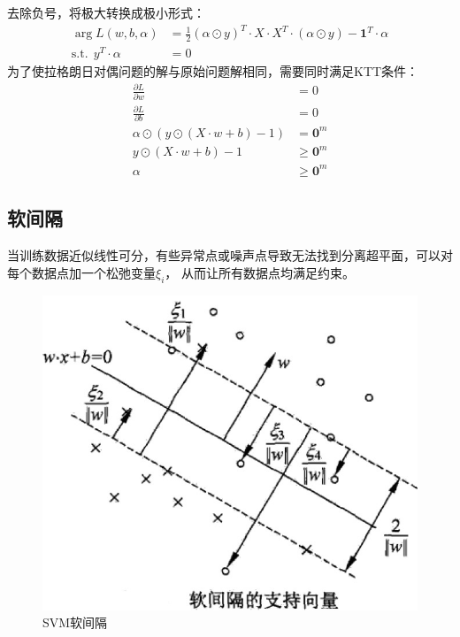 \documentclass[12pt, a4paper, oneside]{ctexart}
\begin{document}
去除负号，将极大转换成极小形式：
\begin{align}
    \mathop{\arg\min_{\alpha}} L(w, b, {\alpha}) &= \frac{1}{2}(\alpha \odot y)^T \cdot X \cdot X^T \cdot (\alpha \odot y) - \boldsymbol{1}^T\cdot\alpha \label{eq8} \\
        \mathrm{ s.t. }\ \   y^T \cdot \alpha &= 0 \nonumber 
\end{align}
为了使拉格朗日对偶问题的解与原始问题解相同，需要同时满足KTT条件：
\begin{align}
    \frac{\partial L}{\partial w} &= 0 \nonumber \\
    \frac{\partial L}{\partial b} &= 0 \nonumber \\
    {\alpha} \odot  (y \odot (X \cdot w + b) - 1) &= \boldsymbol{0}^m \nonumber \\
    y \odot (X \cdot w + b) - 1 &\geq \boldsymbol{0}^m \nonumber \\
    {\alpha} &\geq \boldsymbol{0}^m  \nonumber 
\end{align}

\subsection{软间隔}
当训练数据近似线性可分，有些异常点或噪声点导致无法找到分离超平面，可以对每个数据点加一个松弛变量$\xi_i$，
从而让所有数据点均满足约束。
\begin{figure}[htbp]
    \centering
    \includegraphics[width=14cm]{svm_soft.jpg}
    \caption{SVM软间隔}\label{fig2}
\end{figure}
\end{document}
